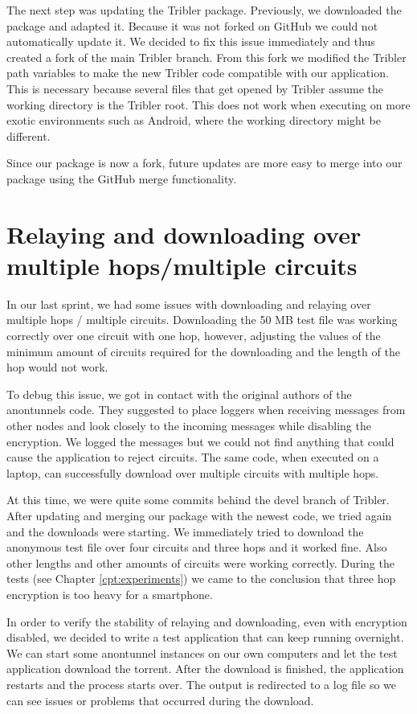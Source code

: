 		The next step was updating the Tribler package. Previously, we downloaded the package and adapted it. Because it was not forked on GitHub we could not automatically update it. We decided to fix this issue immediately and thus created a fork of the main Tribler branch. From this fork we modified the Tribler path variables to make the new Tribler code compatible with our application. This is necessary because several files that get opened by Tribler assume the working directory is the Tribler root. This does not work when executing on more exotic environments such as Android, where the working directory might be different.
		
		Since our package is now a fork, future updates are more easy to merge into our package using the GitHub merge functionality.
			
	\section{Relaying and downloading over multiple hops/multiple circuits}
		In our last sprint, we had some issues with downloading and relaying over multiple hops / multiple circuits. Downloading the 50 MB test file was working correctly over one circuit with one hop, however, adjusting the values of the minimum amount of circuits required for the downloading and the length of the hop would not work.
		
		To debug this issue, we got in contact with the original authors of the anontunnels code. They suggested to place loggers when receiving messages from other nodes and look closely to the incoming messages while disabling the encryption. We logged the messages but we could not find anything that could cause the application to reject circuits. The same code, when executed on a laptop, can successfully download over multiple circuits with multiple hops.
		
		At this time, we were quite some commits behind the devel branch of Tribler. After updating and merging our package with the newest code, we tried again and the downloads were starting. We immediately tried to download the anonymous test file over four circuits and three hops and it worked fine. Also other lengths and other amounts of circuits were working correctly. During the tests (see Chapter \ref{cpt:experiments}) we came to the conclusion that three hop encryption is too heavy for a smartphone.
		
		In order to verify the stability of relaying and downloading, even with encryption disabled, we decided to write a test application that can keep running overnight. We can start some anontunnel instances on our own computers and let the test application download the torrent. After the download is finished, the application restarts and the process starts over. The output is redirected to a log file so we can see issues or problems that occurred during the download.
			
